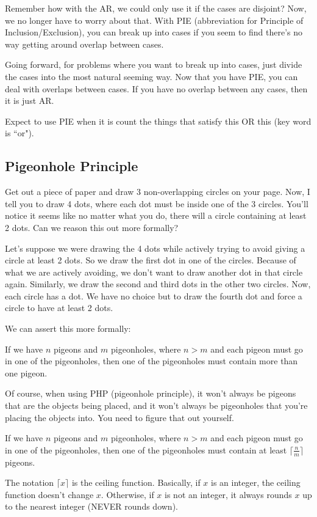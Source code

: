 \documentclass[11pt]{scrartcl}
\begin{document}
Remember how with the AR, we could only use it if the cases are disjoint? Now, we no longer have to worry about that. With PIE (abbreviation for Principle of Inclusion/Exclusion), you can break up into cases if you seem to find there's no way getting around overlap between cases.

\begin{advice}
Going forward, for problems where you want to break up into cases, just divide the cases into the most natural seeming way. Now that you have PIE, you can deal with overlaps between cases. If you have no overlap between any cases, then it is just AR.

Expect to use PIE when it is count the things that satisfy this OR this (key word is ``or").
\end{advice}

\subsection{Pigeonhole Principle}

Get out a piece of paper and draw 3 non-overlapping circles on your page. Now, I tell you to draw 4 dots, where each dot must be inside one of the 3 circles. You'll notice it seems like no matter what you do, there will a circle containing at least 2 dots. Can we reason this out more formally?

Let's suppose we were drawing the 4 dots while actively trying to avoid giving a circle at least 2 dots. So we draw the first dot in one of the circles. Because of what we are actively avoiding, we don't want to draw another dot in that circle again. Similarly, we draw the second and third dots in the other two circles. Now, each circle has a dot. We have no choice but to draw the fourth dot and force a circle to have at least 2 dots.

We can assert this more formally:
\begin{definition}
    If we have $n$ pigeons and $m$ pigeonholes, where $n > m$ and each pigeon must go in one of the pigeonholes, then one of the pigeonholes must contain more than one pigeon.
\end{definition}
Of course, when using PHP (pigeonhole principle), it won't always be pigeons that are the objects being placed, and it won't always be pigeonholes that you're placing the objects into. You need to figure that out yourself.

\begin{definition}
    If we have $n$ pigeons and $m$ pigeonholes, where $n > m$ and each pigeon must go in one of the pigeonholes, then one of the pigeonholes must contain at least $\lceil \frac{n}{m} \rceil$ pigeons.
\end{definition}
The notation $\lceil x \rceil$ is the ceiling function. Basically, if $x$ is an integer, the ceiling function doesn't change $x$. Otherwise, if $x$ is not an integer, it always rounds $x$ up to the nearest integer (NEVER rounds down).
\end{document}
